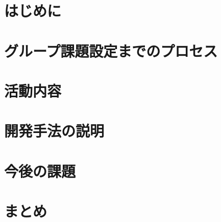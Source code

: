 \documentclass[openany,11pt,papersize]{jsbook}
\begin{document}
%
%

\pagestyle{empty}



\frontmatter





\tableofcontents%

\mainmatter%

%
%
\chapter{はじめに}







%
%
\chapter{グループ課題設定までのプロセス}










%
%
\chapter{活動内容}

%
%




%
%
\chapter{開発手法の説明}



%
%
\chapter{今後の課題}



%
%
\chapter{まとめ}







\end{document}
